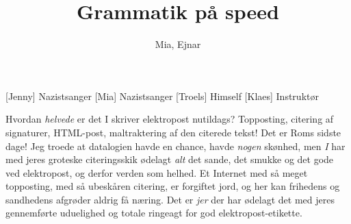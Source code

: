 \documentclass[a4paper,11pt]{article}
\title{Grammatik på speed}
\author{Mia, Ejnar}
\begin{document}
\maketitle

\begin{roles}
[Jenny] Nazistsanger
[Mia] Nazistsanger
[Troels] Himself
[Klaes] Instruktør
\end{roles}

\begin{sketch}

 Hvordan \textit{helvede} er det I skriver elektropost
nutildags?  Topposting, citering af signaturer, HTML-post,
maltraktering af den citerede tekst!  Det er Roms sidste dage!  Jeg
troede at datalogien havde en chance, havde \textit{nogen} skønhed,
men \textit{I} har med jeres groteske citeringsskik ødelagt
\textit{alt} det sande, det smukke og det gode ved elektropost, og
derfor verden som helhed.  Et Internet med så meget topposting, med så
ubeskåren citering, er forgiftet jord, og her kan frihedens og
sandhedens afgrøder aldrig få næring.  Det er \textit{jer} der har
ødelagt det med jeres gennemførte uduelighed og totale ringeagt for
god elektropost-etikette.

\end{sketch}
\end{document}
